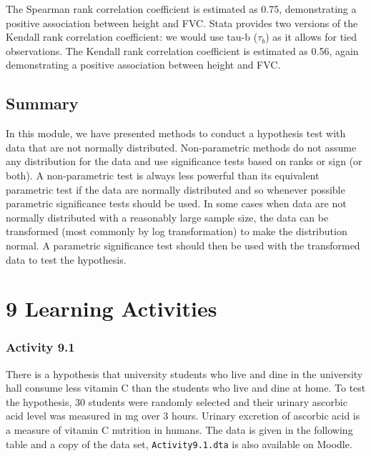 \documentclass[
]{memoir}
\begin{document}
The Spearman rank correlation coefficient is estimated as 0.75, demonstrating a positive association between height and FVC.
Stata provides two versions of the Kendall rank correlation coefficient: we would use tau-b (\(\tau_b\)) as it allows for tied observations. The Kendall rank correlation coefficient is estimated as 0.56, again demonstrating a positive association between height and FVC.

\hypertarget{summary}{%
\section{Summary}\label{summary}}

In this module, we have presented methods to conduct a hypothesis test with data that are not normally distributed. Non-parametric methods do not assume any distribution for the data and use significance tests based on ranks or sign (or both). A non-parametric test is always less powerful than its equivalent parametric test if the data are normally distributed and so whenever possible parametric significance tests should be used. In some cases when data are not normally distributed with a reasonably large sample size, the data can be transformed (most commonly by log transformation) to make the distribution normal. A parametric significance test should then be used with the transformed data to test the hypothesis.

\hypertarget{learning-activities-8}{%
\chapter*{\texorpdfstring{\textbf{9} Learning Activities}{9 Learning Activities}}\label{learning-activities-8}}

\hypertarget{activity-9.1}{%
\subsection*{Activity 9.1}\label{activity-9.1}}

There is a hypothesis that university students who live and dine in the university hall consume less vitamin C than the students who live and dine at home. To test the hypothesis, 30 students were randomly selected and their urinary ascorbic acid level was measured in mg over 3 hours. Urinary excretion of ascorbic acid is a measure of vitamin C nutrition in humans. The data is given in the following table and a copy of the data set, \texttt{Activity9.1.dta} is also available on Moodle.
\end{document}
